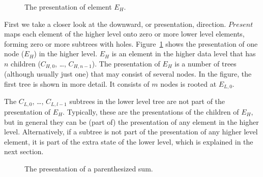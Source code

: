 
\begin{figure}
\begin{center}
\begin{center}
%                    
\end{center}
\caption{The presentation of element $E_H$.}\label{elementPresentation} 
\end{center}
\end{figure}

First we take a closer look at the downward, or presentation, direction. $Present$ maps each element of the higher level onto zero or more lower level elements, forming zero or more subtrees with holes.  Figure~\ref{elementPresentation} shows the presentation of one node ($E_H$) in the higher level. $E_H$ is an element in the higher data level that has $n$ children ($C_{H,0}$, \dots, $C_{H,n-1}$). The presentation of $E_H$ is a number of trees (although usually just one) that may consist of several nodes. In the figure, the first tree is shown in more detail. It consists of $m$ nodes is rooted at $E_{L,0}$. 

The $C_{L,0}$, \dots, $C_{L,l-1}$ subtrees in the lower level tree are not part of the presentation of $E_H$. Typically, these are the presentations of the children of $E_H$, but in general they can be (part of) the presentation of any element in the higher level. Alternatively, if a subtree is not part of the presentation of any higher level element, it is part of the extra state of the lower level, which is explained in the next section.

\begin{figure}
\begin{center}
\begin{center}
%
%
\end{center}
\caption{The presentation of a parenthesized sum.}\label{presentExample} 
\end{center}
\end{figure}

